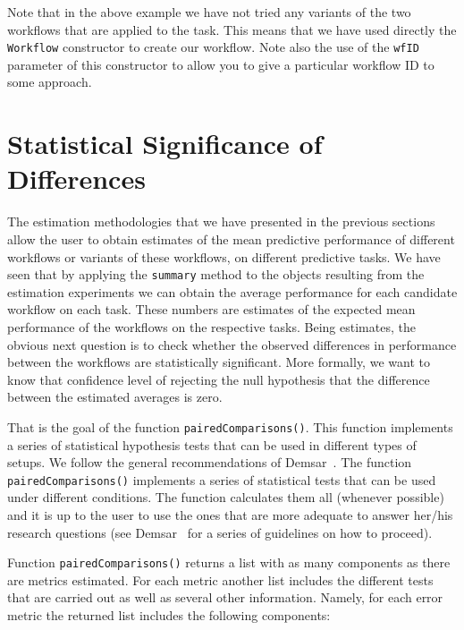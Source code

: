 \documentclass[10pt,a4paper]{article}\usepackage[]{graphicx}\usepackage[]{color}
\begin{document}
Note that in the above example we have not tried any variants of the two workflows that are applied to the task. This means that we have used directly the \texttt{Workflow} constructor to create our workflow. Note also the use of the \texttt{wfID} parameter of this constructor to allow you to give a particular workflow ID to some approach.

\section{Statistical Significance of Differences}

The estimation methodologies that we have presented in the previous
sections allow the user to obtain estimates of the mean predictive
performance of different workflows or variants of these workflows, on
different predictive tasks. We have seen that by applying the
\texttt{summary} method to the objects resulting from the estimation experiments
we can obtain the average performance for each candidate workflow on
each task. These numbers are estimates of the expected mean
performance of the workflows on the respective tasks. Being estimates,
the obvious next question is to check whether the observed differences
in performance between the workflows are statistically
significant. More formally, we want to know that confidence level of rejecting the null hypothesis that the difference between the estimated averages is zero.

That is the goal of the function
\texttt{pairedComparisons()}. This function implements a series of statistical hypothesis tests that can be used in different types of setups. We follow the general recommendations of Demsar~\cite{Dem06}. The function \texttt{pairedComparisons()} implements a series of statistical tests that can be used under different conditions. The function calculates them all (whenever possible) and it is up to the user to use the ones that are more adequate to answer her/his research questions (see Demsar~\cite{Dem06} for a series of guidelines on how to proceed).

Function \texttt{pairedComparisons()} returns a list with as many components as there are metrics estimated. For each metric another list includes the different tests that are carried out as well as several other information. Namely, for each error metric the returned list includes the following components:
\end{document}
